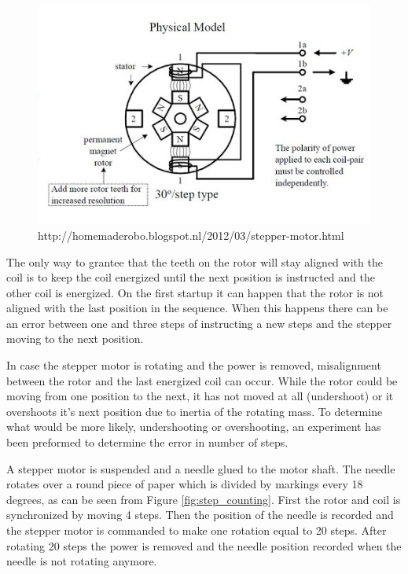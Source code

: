\begin{figure}
	\centering
	\includegraphics[width=\textwidth]{pics/bipolar_stepper.png}
	\caption{http://homemaderobo.blogspot.nl/2012/03/stepper-motor.html}
	\label{fig:bipolarstepper}
\end{figure}

The only way to grantee that the teeth on the rotor will stay aligned with the coil is to keep the coil energized until the next position is instructed and the other coil is energized. 
On the first startup it can happen that the rotor is not aligned with the last position in the sequence.
When this happens there can be an error between one and three steps of instructing a new steps and the stepper moving to the next position.

In case the stepper motor is rotating and the power is removed, misalignment between the rotor and the last energized coil can occur.
While the rotor could be moving from one position to the next, it has not moved at all (undershoot) or it overshoots it's next position due to inertia of the rotating mass. 
To determine what would be more likely, undershooting or overshooting, an experiment has been preformed to determine the error in number of steps.

A stepper motor is suspended and a needle glued to the motor shaft.
The needle rotates over a round piece of paper which is divided by markings every 18 degrees, as can be seen from Figure \ref{fig:step_counting}.
First the rotor and coil is synchronized by moving 4 steps.
Then the position of the needle is recorded and the stepper motor is commanded to make one rotation equal to 20 steps.
After rotating 20 steps the power is removed and the needle position recorded when the needle is not rotating anymore.

